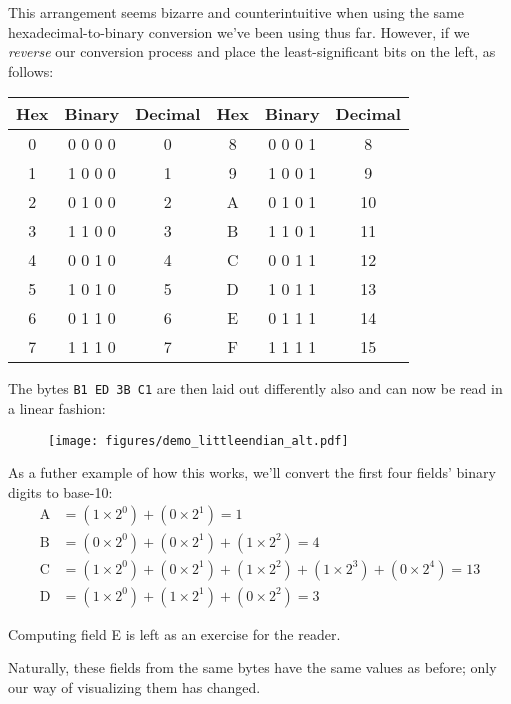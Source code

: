 \clearpage
This arrangement seems bizarre and counterintuitive when using
the same hexadecimal-to-binary conversion we've been using
thus far.
However, if we \textit{reverse} our conversion process
and place the least-significant bits on the left, as follows:
\par
\noindent
\begin{tabular}{| c | c | c || c | c | c |}
\hline
Hex & Binary & Decimal & Hex & Binary & Decimal \\
\hline
0 & 0 0 0 0 & 0 & 8 & 0 0 0 1 & 8 \\
1 & 1 0 0 0 & 1 & 9 & 1 0 0 1 & 9 \\
2 & 0 1 0 0 & 2 & A & 0 1 0 1 & 10 \\
3 & 1 1 0 0 & 3 & B & 1 1 0 1 & 11 \\
4 & 0 0 1 0 & 4 & C & 0 0 1 1 & 12 \\
5 & 1 0 1 0 & 5 & D & 1 0 1 1 & 13 \\
6 & 0 1 1 0 & 6 & E & 0 1 1 1 & 14 \\
7 & 1 1 1 0 & 7 & F & 1 1 1 1 & 15 \\
\hline
\end{tabular}
\par
\noindent
The bytes \texttt{B1 ED 3B C1} are then laid out differently also
and can now be read in a linear fashion:
\begin{figure}[h]
\texttt{[image: figures/demo\_littleendian\_alt.pdf]}
\end{figure}
\par
\noindent
As a futher example of how this works, we'll convert the first
four fields' binary digits to base-10:
\begin{align*}
\text{A} &= (1 \times 2^0) + (0 \times 2^1) = 1 \\
\text{B} &= (0 \times 2^0) + (0 \times 2^1) + (1 \times 2^2) = 4 \\
\text{C} &= (1 \times 2^0) + (0 \times 2^1) + (1 \times 2^2) + (1 \times 2^3) + (0 \times 2^4) = 13 \\
\text{D} &= (1 \times 2^0) + (1 \times 2^1) + (0 \times 2^2) = 3
\end{align*}
\par
\noindent
Computing field E is left as an exercise for the reader.
\par
Naturally, these fields from the same bytes have the same values as before;
only our way of visualizing them has changed.

